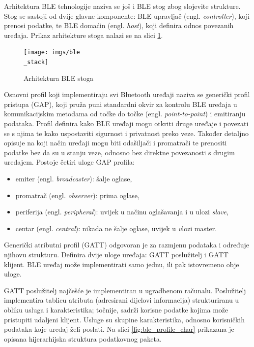 Arhitektura BLE tehnologije naziva se još i BLE stog zbog slojevite strukture. Stog se sastoji od dvije glavne komponente: BLE upravljač (engl. \textit{controller}), koji prenosi podatke, te BLE domaćin (engl. \textit{host}), koji definira odnos povezanih uređaja. Prikaz arhitekture stoga nalazi se na slici \ref{fig:ble_stack}.

\begin{figure}[ht]
	\centering
	\texttt{[image: imgs/ble\\\_stack]}
	\caption{Arhitektura BLE stoga \cite{espressif}}
	\label{fig:ble_stack}
\end{figure}

Osnovni profil koji implementiraju svi Bluetooth uređaji naziva se generički profil pristupa (GAP), koji pruža puni standardni okvir za kontrolu BLE uređaja u komunikacijskim metodama od točke do točke (engl. \textit{point-to-point}) i emitiranju podataka. Profil definira kako BLE uređaji mogu otkriti druge uređaje i povezati se s njima te kako uspostaviti sigurnost i privatnost preko veze. Također detaljno opisuje na koji način uređaji mogu biti odašiljači i promatrači te prenositi podatke bez da su u stanju veze, odnosno bez direktne povezanosti s drugim uređajem. Postoje četiri uloge GAP profila:

\begin{itemize}
	\item emiter (engl. \textit{broadcaster}): šalje oglase,
	\item promatrač (engl. \textit{observer}): prima oglase,
	\item periferija (engl. \textit{peripheral}): uvijek u načinu oglašavanja i u ulozi \textit{slave}, 
	\item centar (engl. \textit{central}): nikada ne šalje oglase, uvijek u \textit ulozi {master}.
\end{itemize}

Generički atributni profil (GATT) odgovoran je za razmjenu podataka i određuje njihovu strukturu. Definira dvije uloge uređaja: GATT poslužitelj i GATT klijent. BLE uređaj može implementirati samo jednu, ili pak istovremeno obje uloge.

GATT poslužitelj najčešće je implementiran u ugradbenom računalu. Poslužitelj implementira tablicu atributa (adresirani dijelovi informacija) strukturiranu u obliku usluga i karakteristika; točnije, sadrži korisne podatke kojima može pristupiti udaljeni klijent. Usluge su skupine karakteristika, odnosno korisničkih podataka koje uređaj želi poslati. Na slici \ref{fig:ble_profile_char} prikazana je opisana hijerarhijska struktura podatkovnog paketa. 

